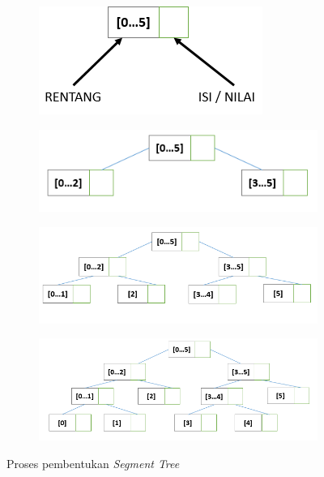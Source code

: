 \documentclass[a4paper]{IEEEtran}
\begin{document}
\begin{figure}[H]
	\begin{subfigure}{.5\textwidth}
		\centering
		\includegraphics[scale=0.45]{images/pembentukan_ST_1.PNG}
		\caption{}
		\label{fig:subbentukST1}
	\end{subfigure}
	\begin{subfigure}{.5\textwidth}
		\centering
		\includegraphics[scale=0.45]{images/pembentukan_ST_2.PNG}
		\caption{}
		\label{fig:subbentukST2}
	\end{subfigure}
	\begin{subfigure}{.5\textwidth}
		\centering \includegraphics[scale=0.3]{images/pembentukan_ST_3.PNG}
		\caption{}
		\label{fig:subbentukST3}
	\end{subfigure}
	\begin{subfigure}{.5\textwidth}
		\centering
		\includegraphics[scale=0.3]{images/pembentukan_ST_4.PNG}
		\caption{}
		\label{fig:subbentukST4}
	\end{subfigure}	
	\caption{Proses pembentukan \textit{Segment Tree}}
	\label{fig:bentukST1}
\end{figure}
\end{document}
